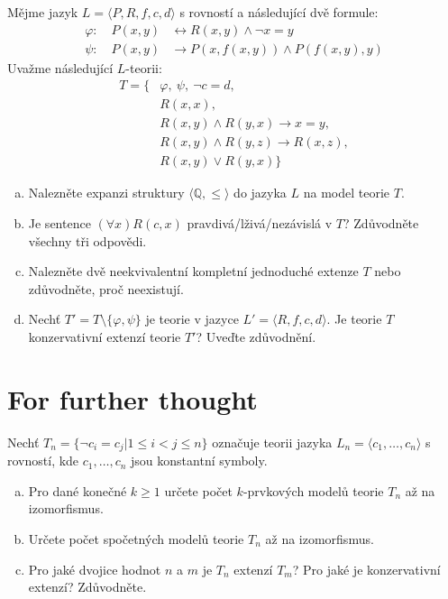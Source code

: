 \begin{problem}

    Mějme jazyk $L=\langle P,R,f,c,d\rangle$ s rovností a následující dvě formule:
    \begin{align*}
        \varphi:\quad P(x,y) &\leftrightarrow R(x,y) \wedge \neg x=y\\
        \psi:\quad P(x,y) &\to P(x,f(x,y)) \wedge P(f(x,y),y)
    \end{align*}
    Uvažme následující $L$-teorii:
    \begin{align*}
        T=\{&\varphi,\ \psi,\ \neg c=d,\\
        &R(x,x),\\ 
        &R(x,y) \wedge R(y,x) \to x=y,\\
        &R(x,y) \wedge R(y,z) \to R(x,z),\\
        &R(x,y) \vee R(y,x)\}    
    \end{align*}
    

    \begin{enumerate}[(a)]
        \item Nalezněte expanzi struktury $\langle \mathbb{Q},\le \rangle$ do jazyka $L$ na model teorie $T$.
        \item Je sentence $(\forall x)R(c,x)$ pravdivá/lživá/nezávislá v $T$? Zdůvodněte všechny tři odpovědi.
        \item Nalezněte dvě neekvivalentní kompletní jednoduché extenze $T$ nebo zdůvodněte, proč neexistují.
        \item Nechť $T'=T\setminus\{\varphi,\psi\}$ je teorie v jazyce $L'=\langle R,f,c,d\rangle$. Je teorie $T$ konzervativní extenzí teorie $T'$? Uveďte zdůvodnění.
    \end{enumerate}

\end{problem}

        
\section*{For further thought}


\begin{problem}

    Nechť $T_n = \{\neg c_i = c_j | 1 \leq i < j \leq n\}$ označuje teorii jazyka $L_n = \langle c_1, \dots, c_n \rangle$ s rovností, kde $c_1, \dots, c_n$ jsou konstantní symboly.
    \begin{enumerate}[(a)]   
        \item Pro dané konečné $k \geq 1$ určete počet $k$-prvkových modelů teorie $T_n$ až na izomorfismus. 
        \item Určete počet spočetných modelů teorie $T_n$ až na izomorfismus. 
        \item Pro jaké dvojice hodnot $n$ a $m$ je $T_n$ extenzí $T_m$? Pro jaké je konzervativní extenzí? Zdůvodněte.
    \end{enumerate}

\end{problem}



